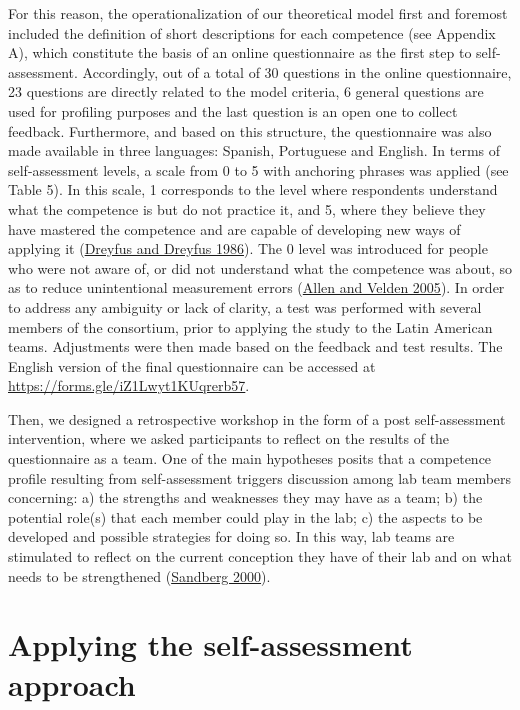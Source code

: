 \documentclass[AMA,STIX1COL,APA,STIX2COL]{WileyNJD-v2}
\begin{document}
For this reason, the operationalization of our theoretical model first
and foremost included the definition of short descriptions for each
competence (see Appendix A), which constitute the basis of an online
questionnaire as the first step to self-assessment. Accordingly, out of
a total of 30 questions in the online questionnaire, 23 questions are
directly related to the model criteria, 6 general questions are used for
profiling purposes and the last question is an open one to collect
feedback. Furthermore, and based on this structure, the questionnaire
was also made available in three languages: Spanish, Portuguese and
English. In terms of self-assessment levels, a scale from 0 to 5 with
anchoring phrases was applied (see Table 5). In this scale, 1
corresponds to the level where respondents understand what the
competence is but do not practice it, and 5, where they believe they
have mastered the competence and are capable of developing new ways of
applying it (\protect\hyperlink{ref-Dreyfus1986}{Dreyfus and Dreyfus
1986}). The 0 level was introduced for people who were not aware of, or
did not understand what the competence was about, so as to reduce
unintentional measurement errors
(\protect\hyperlink{ref-Allen2005}{Allen and Velden 2005}). In order to
address any ambiguity or lack of clarity, a test was performed with
several members of the consortium, prior to applying the study to the
Latin American teams. Adjustments were then made based on the feedback
and test results. The English version of the final questionnaire can be
accessed at \url{https://forms.gle/iZ1Lwyt1KUqrerb57}.

Then, we designed a retrospective workshop in the form of a post
self-assessment intervention, where we asked participants to reflect on
the results of the questionnaire as a team. One of the main hypotheses
posits that a competence profile resulting from self-assessment triggers
discussion among lab team members concerning: a) the strengths and
weaknesses they may have as a team; b) the potential role(s) that each
member could play in the lab; c) the aspects to be developed and
possible strategies for doing so. In this way, lab teams are stimulated
to reflect on the current conception they have of their lab and on what
needs to be strengthened (\protect\hyperlink{ref-Sandberg2000}{Sandberg
2000}).

\hypertarget{applying-the-self-assessment-approach}{%
\section{Applying the self-assessment
approach}\label{applying-the-self-assessment-approach}}
\end{document}
